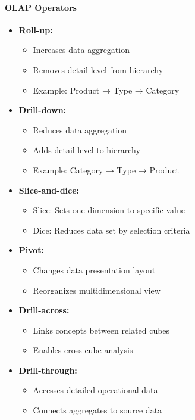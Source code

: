 \documentclass[a4paper,11pt]{article}
\begin{document}
\paragraph{OLAP Operators}
\begin{itemize}
    \item \textbf{Roll-up:} 
        \begin{itemize}
            \item Increases data aggregation
            \item Removes detail level from hierarchy
            \item Example: Product → Type → Category
        \end{itemize}
    \item \textbf{Drill-down:}
        \begin{itemize}
            \item Reduces data aggregation
            \item Adds detail level to hierarchy
            \item Example: Category → Type → Product
        \end{itemize}
    \item \textbf{Slice-and-dice:}
        \begin{itemize}
            \item Slice: Sets one dimension to specific value
            \item Dice: Reduces data set by selection criteria
        \end{itemize}
    \item \textbf{Pivot:}
        \begin{itemize}
            \item Changes data presentation layout
            \item Reorganizes multidimensional view
        \end{itemize}
    \item \textbf{Drill-across:}
        \begin{itemize}
            \item Links concepts between related cubes
            \item Enables cross-cube analysis
        \end{itemize}
    \item \textbf{Drill-through:}
        \begin{itemize}
            \item Accesses detailed operational data
            \item Connects aggregates to source data
        \end{itemize}
\end{itemize}
\end{document}
